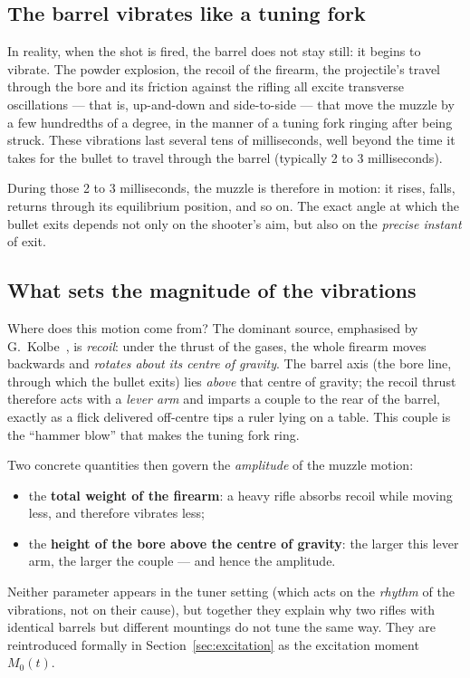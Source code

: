 \documentclass[12pt,a4paper]{article}
\begin{document}
	\subsection{The barrel vibrates like a tuning fork}

	In reality, when the shot is fired, the barrel does not stay still: it begins to vibrate. The powder explosion, the recoil of the firearm, the projectile's travel through the bore and its friction against the rifling all excite transverse oscillations --- that is, up-and-down and side-to-side --- that move the muzzle by a few hundredths of a degree, in the manner of a tuning fork ringing after being struck. These vibrations last several tens of milliseconds, well beyond the time it takes for the bullet to travel through the barrel (typically 2 to 3 milliseconds).

	During those 2 to 3 milliseconds, the muzzle is therefore in motion: it rises, falls, returns through its equilibrium position, and so on. The exact angle at which the bullet exits depends not only on the shooter's aim, but also on the \emph{precise instant} of exit.

	\subsection{What sets the magnitude of the vibrations}

	Where does this motion come from? The dominant source, emphasised by G.\ Kolbe~\cite{KolbeSim}, is \emph{recoil}: under the thrust of the gases, the whole firearm moves backwards and \emph{rotates about its centre of gravity}. The barrel axis (the bore line, through which the bullet exits) lies \emph{above} that centre of gravity; the recoil thrust therefore acts with a \emph{lever arm} and imparts a couple to the rear of the barrel, exactly as a flick delivered off-centre tips a ruler lying on a table. This couple is the ``hammer blow'' that makes the tuning fork ring.

	Two concrete quantities then govern the \emph{amplitude} of the muzzle motion:
	\begin{itemize}
		\item the \textbf{total weight of the firearm}: a heavy rifle absorbs recoil while moving less, and therefore vibrates less;
		\item the \textbf{height of the bore above the centre of gravity}: the larger this lever arm, the larger the couple --- and hence the amplitude.
	\end{itemize}
	Neither parameter appears in the tuner setting (which acts on the \emph{rhythm} of the vibrations, not on their cause), but together they explain why two rifles with identical barrels but different mountings do not tune the same way. They are reintroduced formally in Section~\ref{sec:excitation} as the excitation moment $M_0(t)$.
\end{document}
